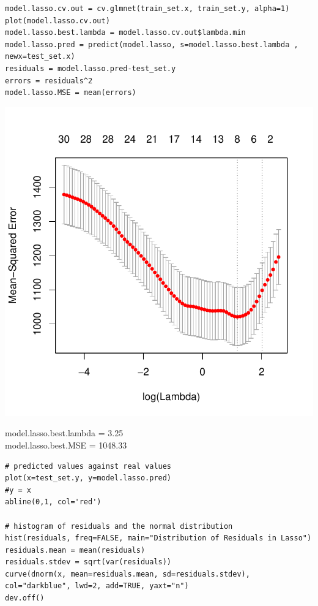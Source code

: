 \documentclass[]{report}
\begin{document}
\begin{lstlisting}
model.lasso.cv.out = cv.glmnet(train_set.x, train_set.y, alpha=1)
plot(model.lasso.cv.out)
model.lasso.best.lambda = model.lasso.cv.out$lambda.min
model.lasso.pred = predict(model.lasso, s=model.lasso.best.lambda , newx=test_set.x)
residuals = model.lasso.pred-test_set.y
errors = residuals^2
model.lasso.MSE = mean(errors)

\end{lstlisting}

\begin{center}
	\includegraphics[width=0.8\linewidth]{Figures/lasso_mse.pdf}
\end{center}

\begin{center} 
	model.lasso.best.lambda = 3.25 \\
	model.lasso.best.MSE    = 1048.33
\end{center} 

\begin{lstlisting}
# predicted values against real values
plot(x=test_set.y, y=model.lasso.pred)
#y = x
abline(0,1, col='red')

# histogram of residuals and the normal distribution
hist(residuals, freq=FALSE, main="Distribution of Residuals in Lasso")
residuals.mean = mean(residuals)
residuals.stdev = sqrt(var(residuals))
curve(dnorm(x, mean=residuals.mean, sd=residuals.stdev), col="darkblue", lwd=2, add=TRUE, yaxt="n")
dev.off()
\end{lstlisting}
\end{document}

